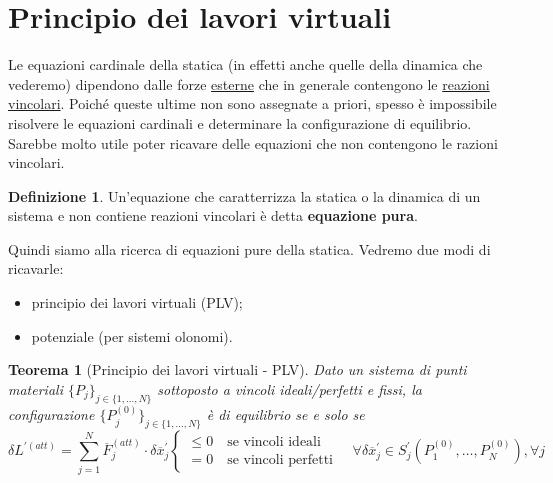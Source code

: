 \documentclass{book}
\theoremstyle{plain}
\newtheorem{teo}{Teorema}[chapter]
\theoremstyle{plain}
\theoremstyle{plain}
\theoremstyle{plain}
\theoremstyle{plain}
\theoremstyle{definition}
\newtheorem{defi}{Definizione}[chapter]
\theoremstyle{remark}
\theoremstyle{definition}
\begin{document}
\section{Principio dei lavori virtuali}

Le equazioni cardinale della statica (in effetti anche quelle della dinamica che vederemo) dipendono dalle forze \underline{esterne} che in generale contengono le \underline{reazioni vincolari}.
Poiché queste ultime non sono assegnate a priori, spesso è impossibile risolvere le equazioni cardinali e determinare la configurazione di equilibrio. Sarebbe molto utile poter ricavare delle equazioni che non contengono le razioni vincolari.

\begin{defi}
    Un'equazione che caratterrizza la statica o la dinamica di un sistema e non contiene reazioni vincolari è detta \textbf{equazione pura}.
\end{defi}

\noindent Quindi siamo alla ricerca di equazioni pure della statica. Vedremo due modi di ricavarle:
\begin{itemize}
    \item principio dei lavori virtuali (PLV);
    \item potenziale (per sistemi olonomi).
\end{itemize}

\begin{teo}[Principio dei lavori virtuali - PLV]
    Dato un sistema di punti materiali $\{P_j\}_{j \in\{1, \ldots, N\}}$ sottoposto a vincoli ideali/perfetti e fissi, la configurazione $\{P_j^{(0)}\}_{j \in\{1, \ldots, N\}}$ è di equilibrio se e solo se
    \begin{displaymath}
    \boxed{
        \delta L^{\prime(att)}=\sum_{j=1}^{N} \overline{F}_{j}^{(att)} \cdot \delta \overline{x}_{j}^{\prime}
        \begin{cases}
            \leq 0 \quad \text{se vincoli ideali} \\
            = 0 \quad \text{se vincoli perfetti}
        \end{cases}
        \quad \forall \delta \overline{x}_{j}^{\prime} \in S_{j}^{\prime}\left(P_1^{(0)},\ldots,P_N^{(0)}\right), \forall j
        }
    \end{displaymath}
\end{teo}
\end{document}
